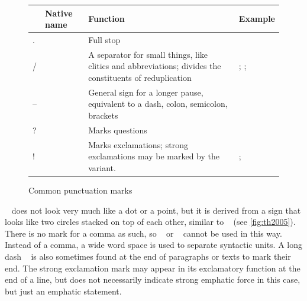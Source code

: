 \begin{figure}[htp]
\caption{Common punctuation marks}
\begin{tabu} to 
\toprule
\tableheaderfont

	& Native name
	& Function
	& Example
	\\
	
\toprule

.
	& 
	& Full stop
	& 
	\\
	
\midrule

/
	& 
	& A separator for small things, like clitics and abbreviations; 
		divides the constituents of reduplication
	& ; %
		; %
	\\
	
\midrule

–
	& 
	& General sign for a longer pause, equivalent to a dash, 
		colon, semicolon, brackets 
	& 
	\\

\midrule

?
	& 
	& Marks questions
	& 
	\\

\midrule

!
	& 
	& Marks exclamations; strong exclamations may be marked by the  
		variant.
	& ; %
	\\

\bottomrule
\end{tabu}
\label{fig:thpunctcom}
\end{figure}

~ does not look very much like a dot or a point, but it is 
derived from a sign that looks like two circles stacked on top of each other, 
similar to \ayr{/}~\orth{-} (see \autoref{fig:th2005}). There is no mark for a 
comma as such, so \ayr{/}~\orth{-} or ~\orth{--} cannot be 
used in this way. Instead of a comma, a wide word space is used to separate 
syntactic units. A long dash ~\orth{---} is also sometimes found at the 
end of paragraphs or texts to mark their end. The strong 
exclamation mark  may appear in its exclamatory function at the end 
of a line, but does not necessarily indicate strong emphatic force in this 
case, but just an emphatic statement.

